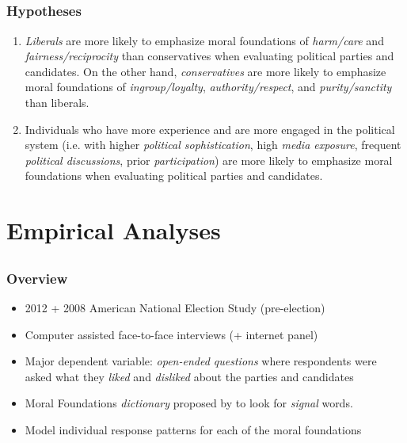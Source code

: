 \documentclass{beamer}
\begin{document}
\subsection{}
\begin{frame}%
  \frametitle{Hypotheses}
  \begin{enumerate}
    \item \emph{Liberals} are more likely to emphasize moral foundations of \emph{harm/care} and \emph{fairness/reciprocity} than conservatives when evaluating political parties and candidates. On the other hand, \emph{conservatives} are more likely to emphasize moral foundations of \emph{ingroup/loyalty}, \emph{authority/respect}, and \emph{purity/sanctity} than liberals.
    \item Individuals who have more experience and are more engaged in the political system (i.e. with higher \emph{political sophistication}, high \emph{media exposure}, frequent \emph{political discussions}, prior \emph{participation}) are more likely to emphasize moral foundations when evaluating political parties and candidates.
  \end{enumerate}
\end{frame}

\section{Empirical Analyses}
\subsection{}
\begin{frame}%
  \frametitle{Overview}
  \begin{itemize}
    \item 2012 + 2008 American National Election Study (pre-election)
    \item Computer assisted face-to-face interviews (+ internet panel)
    \item Major dependent variable: \emph{open-ended questions} where respondents were asked what they \emph{liked} and \emph{disliked} about the parties and candidates
    \item Moral Foundations \emph{dictionary} proposed by \citep{graham2009liberals} to look for \emph{signal} words.
    \item Model individual response patterns for each of the moral foundations
  \end{itemize}
\end{frame}
\end{document}
